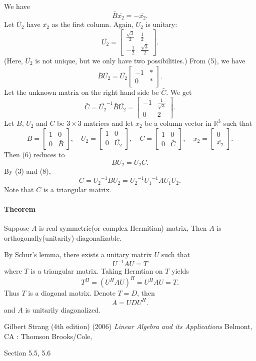 \documentclass{article}
\begin{document}
We have
\[\bar B\overline{x_2}=-\overline{x_2}.\tag{5}\]
Let $\overline{U_2}$ have $\overline{x_2}$ as the first column.
Again, $U_2$ is unitary:
\[\overline{U_2}=\begin{bmatrix}
\frac{\sqrt3}2	&\frac12\\
-\frac12		&\frac{\sqrt3}2
\end{bmatrix}.\]
(Here, $\overline{U_2}$ is not unique, but we only have two possibilities.)
From (5), we have
\[
\bar B\overline{U_2}=\overline{U_2}
\begin{bmatrix}
-1	&*\\
0	&*
\end{bmatrix}.\tag{6}
\]
Let the unknown matrix on the right hand side be $\bar C$.
We get
\[\bar C=\overline{U_2}^{-1}\bar B\overline{U_2}=\begin{bmatrix}
-1	&\frac1{\sqrt3}\\
0	&2
\end{bmatrix}.\]
Let $B$, $U_2$ and $C$ be $3\times 3$ matrices and let $x_2$ be a column vector in $\mathbb R^3$ such that
\[
B=\begin{bmatrix}
1&0\\0&\bar B
\end{bmatrix}
,\quad
U_2=\begin{bmatrix}
1&0\\0&\overline{U_2}
\end{bmatrix}
,\quad
C=\begin{bmatrix}
1&0\\0&\bar C
\end{bmatrix}
,\quad
x_2=\begin{bmatrix}
0\\\overline{x_2}
\end{bmatrix}.
\tag{7}\]
Then (6) reduces to
\[BU_2=U_2C.\tag{8}\]
By (3) and (8),
\[C={U_2}^{-1}BU_2={U_2}^{-1}{U_1}^{-1}AU_1U_2.\]
Note that $C$ is a triangular matrix.

\paragraph{Theorem}
Suppose $A$ is real symmetric(or complex Hermitian) matrix,
Then $A$ is orthogonally(unitarily) diagonalizable.

\medskip
By Schur's lemma, there exists a unitary matrix $U$ such that
\[U^{-1}AU=T\]
where $T$ is a triangular matrix.
Taking Hermtian on $T$ yields
\[T^H=(U^HAU)^H=U^HAU=T.\]
Thus $T$ is a diagonal matrix.
Denote $T=D$, then
\[A=UD U^H.\]
and $A$ is unitarily diagonalized.

\begin{thebibliography}{9}
Gilbert Strang (4th edition) (2006) \textit{Linear Algebra and its Applications} Belmont, CA : Thomson Brooks/Cole,
\end{thebibliography}
Section 5.5, 5.6
\end{document}
